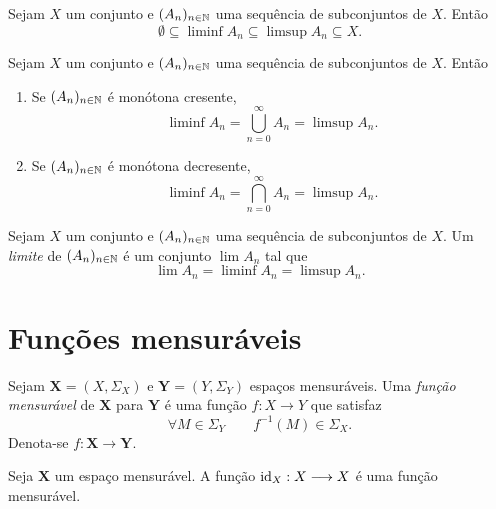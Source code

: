 \begin{prop}
	Sejam $X$ um conjunto e $(A_n)_{n \in \mathbb{N}}$ uma sequência de subconjuntos de $X$. Então
	\begin{equation*}
	\emptyset \subseteq \liminf A_n \subseteq \limsup A_n \subseteq X.
	\end{equation*}
\end{prop}

\begin{prop}
	Sejam $X$ um conjunto e $(A_n)_{n \in \mathbb{N}}$ uma sequência de subconjuntos de $X$. Então
	\begin{enumerate}
	\item Se $(A_n)_{n \in \mathbb{N}}$ é monótona cresente,
	\begin{equation*}
	\liminf A_n = \bigcup_{n=0}^\infty A_n = \limsup A_n.
	\end{equation*}
	
	\item Se $(A_n)_{n \in \mathbb{N}}$ é monótona decresente,
	\begin{equation*}
	\liminf A_n = \bigcap_{n=0}^\infty A_n = \limsup A_n.
	\end{equation*}
	\end{enumerate}
\end{prop}

\begin{defi}
	Sejam $X$ um conjunto e $(A_n)_{n \in \mathbb{N}}$ uma sequência de subconjuntos de $X$. Um \emph{limite} de $(A_n)_{n \in \mathbb{N}}$ é um conjunto $\lim A_n$ tal que
	\begin{equation*}
	\lim A_n = \liminf A_n = \limsup A_n.
	\end{equation*}
\end{defi}


\section{Funções mensuráveis}

\begin{defi}
Sejam $\bm X = (X,\Sigma_X)$ e $\bm Y = (Y,\Sigma_Y)$ espaços mensuráveis. Uma \emph{função mensurável} de $\bm X$ para $\bm Y$ é uma função $f: X \to Y$ que satisfaz
	\begin{equation*}
	\forall M \in \Sigma_Y \qquad f^{-1}(M) \in \Sigma_X.
	\end{equation*}
Denota-se $f: \bm X \to \bm Y$.
\end{defi}

\begin{prop}
Seja $\bm X$ um espaço mensurável. A função $\mathrm{id}_X: X \longrightarrow X$ é uma função mensurável.
\end{prop}

